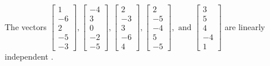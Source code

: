\begin{exercise}
\begin{exerciseStatement}
  \end{exerciseStatement}
  \begin{exerciseAnswer}
   The vectors \(\left[\begin{array}{r}
1 \\
-6 \\
2 \\
-5 \\
-3
\end{array}\right] , \left[\begin{array}{r}
-4 \\
3 \\
0 \\
-2 \\
-5
\end{array}\right] , \left[\begin{array}{r}
2 \\
-3 \\
3 \\
-6 \\
4
\end{array}\right] , \left[\begin{array}{r}
2 \\
-5 \\
-4 \\
5 \\
-5
\end{array}\right] , \text{ and } \left[\begin{array}{r}
3 \\
5 \\
4 \\
-4 \\
1
\end{array}\right]\) are 
  	 linearly independent  .
  


  \end{exerciseAnswer}
\end{exercise}